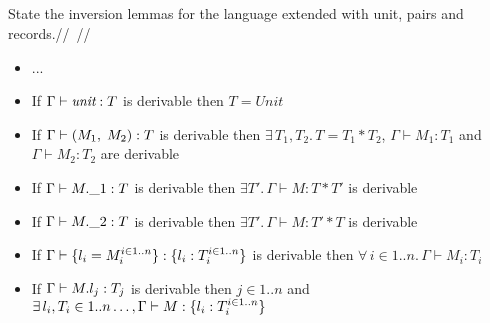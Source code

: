 \subsection{}

State the inversion lemmas for the language extended with unit, pairs and records.//~//

\begin{itemize}
  \item ...
	\item If $\Gamma \vdash \emph{unit}: T$ is derivable then $T = Unit$
	\item If $\Gamma \vdash (M_1,\;M_2): T$ is derivable then
	      $\exists\,T_1, T_2.\, T = T_1 \ast T_2$, $\Gamma \vdash M_1: T_1$ and
	      $\Gamma \vdash M_2: T_2$ are derivable
	\item If $\Gamma \vdash M.\_1: T$ is derivable then
	      $\exists T'.\, \Gamma \vdash M: T \ast T'$ is derivable
	\item If $\Gamma \vdash M.\_2: T$ is derivable then
	      $\exists T'.\, \Gamma \vdash M: T' \ast T$ is derivable
	\item If $\Gamma \vdash \{l_i=M_i^{i \in 1..n}\}: \{l_i:T_i^{i \in 1..n}\}$ is derivable
	      then $\forall\, i \in 1..n.\, \Gamma \vdash M_i: T_i$
	\item If $\Gamma \vdash M.l_j: T_j$ is derivable then $j \in 1..n$ and
	      $\exists\, l_i,T_i \in 1..n\dots,\Gamma \vdash M: \{l_i: T_i^{i \in 1..n}\}$
\end{itemize}
